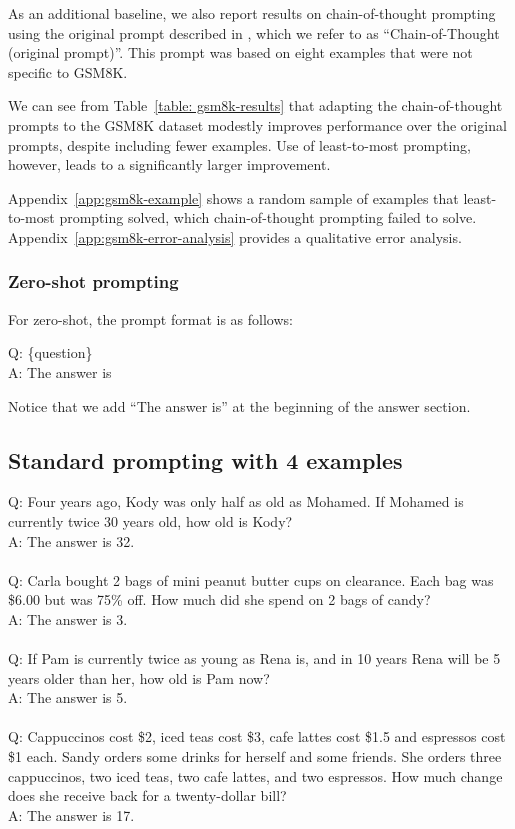 As an additional baseline, we also report results on chain-of-thought prompting using the original prompt described in \citet{wei2022chain}, which we refer to as ``Chain-of-Thought (original prompt)''. This prompt was based on eight examples that were not specific to GSM8K.

We can see from Table~\ref{table: gsm8k-results} that adapting the chain-of-thought prompts to the GSM8K dataset modestly improves performance over the original prompts, despite including fewer examples. Use of least-to-most prompting, however, leads to a significantly larger improvement.



Appendix~\ref{app:gsm8k-example} shows a random sample of examples that least-to-most prompting solved, which chain-of-thought prompting failed to solve. Appendix~\ref{app:gsm8k-error-analysis} provides a qualitative error analysis.

\subsubsection{Zero-shot prompting}
For zero-shot, the prompt format is as follows:

Q: \{question\}\\
A: The answer is

Notice that we add ``The answer is'' at the beginning of the answer section.

\subsection{Standard prompting with 4 examples}
Q: Four years ago, Kody was only half as old as Mohamed. If Mohamed is currently twice 30 years old, how old is Kody? \\
A: The answer is 32. \\
 \\
Q: Carla bought 2 bags of mini peanut butter cups on clearance. Each bag was \$6.00 but was 75\% off. How much did she spend on 2 bags of candy? \\
A: The answer is 3. \\
 \\
Q: If Pam is currently twice as young as Rena is, and in 10 years Rena will be 5 years older than her, how old is Pam now? \\
A: The answer is 5. \\
 \\
Q: Cappuccinos cost \$2, iced teas cost \$3, cafe lattes cost \$1.5 and espressos cost \$1 each. Sandy orders some drinks for herself and some friends. She orders three cappuccinos, two iced teas, two cafe lattes, and two espressos. How much change does she receive back for a twenty-dollar bill? \\
A: The answer is 17. \\


